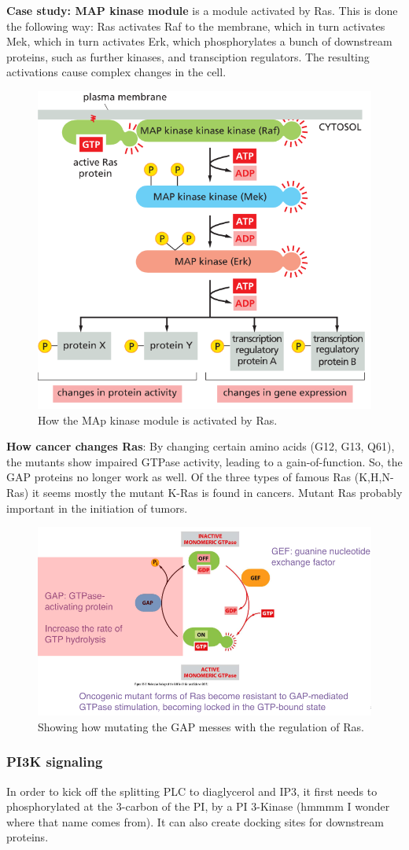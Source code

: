 \documentclass[../main.tex]{subfiles}
\begin{document}
\textbf{Case study: MAP kinase module} is a module activated by Ras. This is done the following way: Ras activates Raf to the membrane, which in turn activates Mek, which in turn activates Erk, which phosphorylates a bunch of downstream proteins, such as further kinases, and transciption regulators. The resulting activations cause complex changes in the cell.
\begin{figure}[H]
	\centering
	\includegraphics[height=0.3\textwidth]{Ras_MAP}
	\caption{How the MAp kinase module is activated by Ras.}
\end{figure}

\textbf{How cancer changes Ras}: By changing certain amino acids (G12, G13, Q61), the mutants show impaired GTPase activity, leading to a gain-of-function. So, the GAP proteins no longer work as well. Of the three types of famous Ras (K,H,N-Ras) it seems mostly the mutant K-Ras is found in cancers. Mutant Ras probably important in the initiation of tumors.
\begin{figure}[H]
	\centering
	\includegraphics[height=0.3\textwidth]{Ras_canc}
	\caption{Showing how mutating the GAP messes with the regulation of Ras.}
\end{figure}

\subsubsection{PI3K signaling}

In order to kick off the splitting PLC to diaglycerol and IP3, it first needs to phosphorylated at the 3-carbon of the PI, by a PI 3-Kinase (hmmmm I wonder where that name comes from). It can also create docking sites for downstream proteins.
\end{document}
